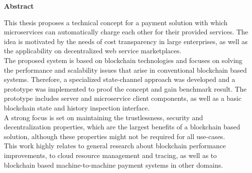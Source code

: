 \thispagestyle{empty}
\vspace*{1.0cm}

\begin{center}
    \textbf{Abstract}
\end{center}

\vspace*{0.5cm}

\noindent

This thesis proposes a technical concept for a payment solution with which microservices can automatically charge each other for their provided services. The idea is motivated by the needs of cost transparency in large enterprises, as well as the applicability on decentralized web service marketplaces.\\

The proposed system is based on blockchain technologies and focuses on solving the performance and scalability issues that arise in conventional blockchain based systems. Therefore, a specialized state-channel approach was developed and a prototype was implemented to proof the concept and gain benchmark result. The prototype includes server and microservice client components, as well as a basic blockchain state and history inspection interface.\\

A strong focus is set on maintaining the trustlessness, security and decentralization properties, which are the largest benefits of a blockchain based solution, although these properties might not be required for all use-cases.\\

This work highly relates to general research about blockchain performance improvements, to cloud resource management and tracing, as well as to blockchain based machine-to-machine payment systems in other domains.
